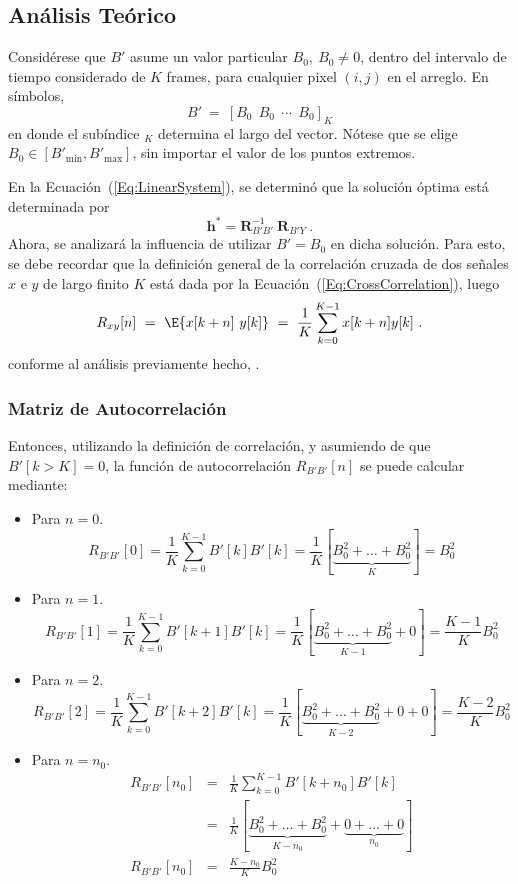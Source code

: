 \subsection{Análisis Teórico}
Considérese que $B'$ asume un valor particular $B_0,~B_0\neq0$,  dentro del intervalo de tiempo considerado de $K$ frames, para cualquier pixel $(i,j)$ en el arreglo. En símbolos,
$$B'~=~\left[B_0~~B_0~~\cdots~~B_0\right]_K$$
en donde el subíndice $_K$ determina el largo del vector. Nótese que se elige $B_0\in[B'_{\min},B'_{\max}]$, sin importar el valor de los puntos extremos.

En la Ecuación~(\ref{Eq:LinearSystem}), se determinó que la solución óptima está determinada por
$$\bm h^* = \bm R_{B'B'}^{-1}~\bm R_{B'Y}~.$$
Ahora, se analizará la influencia de utilizar $B' = B_0$ en dicha solución. Para esto, se debe recordar que la definición general de la correlación cruzada de dos señales $x$ e $y$ de largo finito $K$ está dada por la Ecuación~(\ref{Eq:CrossCorrelation}), luego
$$R_{xy}[n]~=~\E{x[k+n]~y[k]}~=~\frac{1}{K}\sum_{k=0}^{K-1}x[k+n]y[k] ~.$$
conforme al análisis previamente hecho, \cite{proakis-dsp}.


\subsubsection{Matriz de Autocorrelación}
Entonces, utilizando la definición de correlación, y asumiendo de que $B'[k>K]=0$, la función de autocorrelación $R_{B'B'}[n]$ se puede calcular mediante:
\begin{itemize}
\item Para $n=0$.
$$ R_{B'B'}[0] = \frac{1}{K}\sum_{k=0}^{K-1} B'[k]B'[k] = \frac{1}{K} \left[ \underbrace{B_0^2+\dots+B_0^2}_K \right] = B_0^2$$
%
\item Para $n=1$.
$$R_{B'B'}[1] = \frac{1}{K}\sum_{k=0}^{K-1} B'[k+1]B'[k] 
= \frac{1}{K} \left[ \underbrace{B_0^2+\dots+B_0^2}_{K-1} + 0 \right]
= \frac{K-1}{K} B_0^2$$
%
\item Para $n=2$.
$$R_{B'B'}[2] = \frac{1}{K}\sum_{k=0}^{K-1} B'[k+2]B'[k]
= \frac{1}{K} \left[ \underbrace{B_0^2+\dots+B_0^2}_{K-2} + 0 + 0\right]
= \frac{K-2}{K}B_0^2$$
%
\item Para $n=n_0$.
\begin{eqnarray}\nonumber
 R_{B'B'}[n_0] &=& \frac{1}{K}\sum_{k=0}^{K-1} B'[k+n_0]B'[k]\\\nonumber
&=& \frac{1}{K} \left[ \underbrace{B_0^2+\dots+B_0^2}_{K-n_0} + \underbrace{0+\dots+0}_{n_0}\right]\\
 R_{B'B'}[n_0] &=& \frac{K-n_0}{K}B_0^2
\label{Eq:Bp-Autocorrelation}
\end{eqnarray}
\end{itemize}

